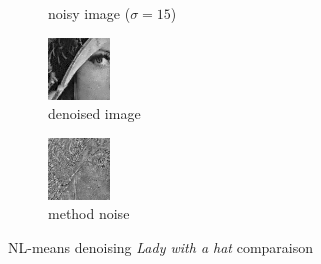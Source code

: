 \documentclass[a4paper, twocolumn, twoside]{article}
\begin{document}
\begin{figure}[h!]
\begin{subfigure}{.24\textwidth}
        \caption{noisy image ($\sigma = 15$)}
    \end{subfigure}
    \hfill
    \begin{subfigure}{.24\textwidth}
        \centering
        \includegraphics[width=\linewidth]{images/denoised_lady.png}
        \caption{denoised image}
    \end{subfigure}
	\hfill
    \begin{subfigure}{.24\textwidth}
        \centering
        \includegraphics[width=\linewidth]{images/method_noise_lady.png}
        \caption{method noise}
    \end{subfigure}
	\caption{NL-means denoising \textit{Lady with a hat} \cite{ladyhat} comparaison}
\end{figure}
\end{document}
